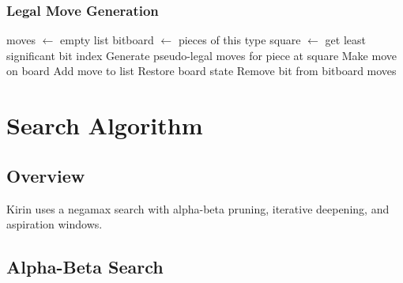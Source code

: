 \documentclass[11pt,a4paper]{report}
\begin{document}
\subsection{Legal Move Generation}

\begin{algorithm}
\caption{Legal Move Generation}
\begin{algorithmic}[1]
    \State moves $\gets$ empty list
        \State bitboard $\gets$ pieces of this type
            \State square $\gets$ get least significant bit index
            \State Generate pseudo-legal moves for piece at square
                \State Make move on board
                    \State Add move to list
                \EndIf
                \State Restore board state
            \EndFor
            \State Remove bit from bitboard
        \EndWhile
    \EndFor
    \State \Return moves
\EndProcedure
\end{algorithmic}
\end{algorithm}

\chapter{Search Algorithm}

\section{Overview}

Kirin uses a negamax search with alpha-beta pruning, iterative deepening, and aspiration windows.

\section{Alpha-Beta Search}
\end{document}
